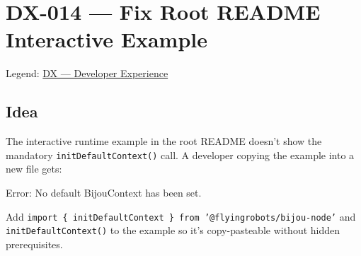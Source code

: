 \chapter{DX-014 --- Fix Root README Interactive Example}\label{record-319}

\smallskip

Legend: \href{https://github.com/flyingrobots/bijou/blob/cbd70612140e7a450d764b3c7be1c6af878b99bc/docs/method/graveyard/legends/DX-developer-experience.md}{DX --- Developer Experience}

\section{Idea}\label{record-319-idea}

The interactive runtime example in the root README doesn't show the mandatory \texttt{i\allowbreak{}n\allowbreak{}i\allowbreak{}t\allowbreak{}D\allowbreak{}e\allowbreak{}f\allowbreak{}a\allowbreak{}u\allowbreak{}l\allowbreak{}t\allowbreak{}C\allowbreak{}o\allowbreak{}n\allowbreak{}t\allowbreak{}e\allowbreak{}x\allowbreak{}t\allowbreak{}(\allowbreak{})} call. A developer copying the example into a new file gets:

\begin{CodeBlock}
Error: No default BijouContext has been set.
\end{CodeBlock}

Add \texttt{i\allowbreak{}m\allowbreak{}p\allowbreak{}o\allowbreak{}r\allowbreak{}t\allowbreak{} \allowbreak{}\{\allowbreak{} \allowbreak{}i\allowbreak{}n\allowbreak{}i\allowbreak{}t\allowbreak{}D\allowbreak{}e\allowbreak{}f\allowbreak{}a\allowbreak{}u\allowbreak{}l\allowbreak{}t\allowbreak{}C\allowbreak{}o\allowbreak{}n\allowbreak{}t\allowbreak{}e\allowbreak{}x\allowbreak{}t\allowbreak{} \allowbreak{}\}\allowbreak{} \allowbreak{}f\allowbreak{}r\allowbreak{}o\allowbreak{}m\allowbreak{} \allowbreak{}'\allowbreak{}@\allowbreak{}f\allowbreak{}l\allowbreak{}y\allowbreak{}i\allowbreak{}n\allowbreak{}g\allowbreak{}r\allowbreak{}o\allowbreak{}b\allowbreak{}o\allowbreak{}t\allowbreak{}s\allowbreak{}/\allowbreak{}b\allowbreak{}i\allowbreak{}j\allowbreak{}o\allowbreak{}u\allowbreak{}-\allowbreak{}n\allowbreak{}o\allowbreak{}d\allowbreak{}e\allowbreak{}'} and \texttt{i\allowbreak{}n\allowbreak{}i\allowbreak{}t\allowbreak{}D\allowbreak{}e\allowbreak{}f\allowbreak{}a\allowbreak{}u\allowbreak{}l\allowbreak{}t\allowbreak{}C\allowbreak{}o\allowbreak{}n\allowbreak{}t\allowbreak{}e\allowbreak{}x\allowbreak{}t\allowbreak{}(\allowbreak{})} to the example so it's copy-pasteable without hidden prerequisites.

